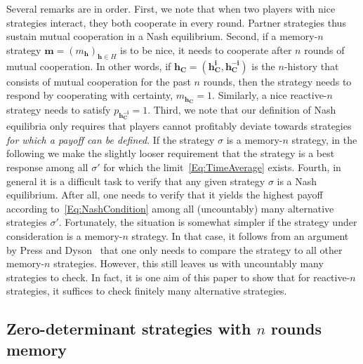 \documentclass[9pt,twoside,lineno]{pnas-new}
\theoremstyle{plainCl1}
\theoremstyle{plainCl2}
\begin{document}
\noindent
Several remarks are in order. First, we note that when two players with nice strategies interact, they both cooperate in every round. Partner strategies thus sustain mutual cooperation in a Nash equilibrium. 
Second, if a memory-$n$ strategy $\mathbf{m}\!=\!(m_\mathbf{h})_{\mathbf{h}\in H}$ is to be nice, it needs to cooperate after $n$ rounds of mutual cooperation. In other words, if $\mathbf{h_C} \!=\! (\mathbf{h^i_C},\mathbf{h^{-i}_C})$ is the $n$-history that consists of mutual cooperation for the past $n$ rounds, then the strategy needs to respond by cooperating with certainty, $m_\mathbf{h_C}\!=\!1$.  Similarly, a nice reactive-$n$ strategy needs to satisfy $p_\mathbf{h^{-i}_C}\!=\!1$.
Third, we note that our definition of Nash equilibria only requires that players cannot profitably deviate towards strategies {\it for which a payoff can be defined}. If the strategy $\sigma$ is a memory-$n$ strategy, in the following we make the slightly looser requirement that the strategy is a best response among all $\sigma'$ for which the limit~\eqref{Eq:TimeAverage} exists. 
Fourth, in general it is a difficult task to verify that any given strategy $\sigma$ is a Nash equilibrium. 
After all, one needs to verify that it yields the highest payoff according to~\eqref{Eq:NashCondition} among all (uncountably) many alternative strategies $\sigma'$. 
Fortunately, the situation is somewhat simpler if the strategy under consideration is a memory-$n$ strategy. 
In that case, it follows from an argument by Press and Dyson~\cite{press:PNAS:2012}  that one only needs to compare the strategy to all other memory-$n$ strategies. 
However, this still leaves us with uncountably many strategies to check. 
In fact, it is one aim of this paper to show that for reactive-$n$ strategies, it suffices to check finitely many alternative strategies. 




\subsection{Zero-determinant strategies with $n$ rounds memory}\label{section:tft_and_gtft}
\end{document}
